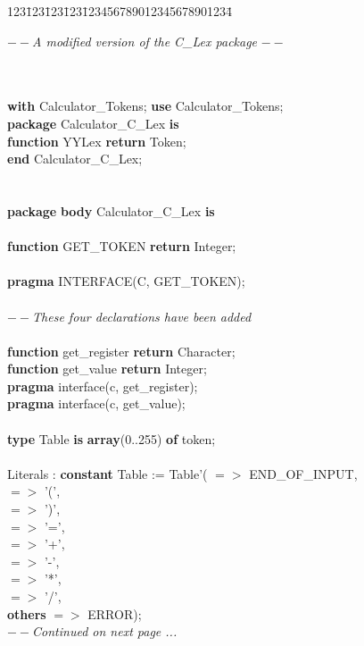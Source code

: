 \begin{tabbing}
123\=123\=123\=123\=123456789012345678901234\= \kill
\centerline{$--${\it  A modified version of the C\_Lex package }$--$}\\
\\
{\bf with} Calculator\_Tokens; {\bf use} Calculator\_Tokens;\\
{\bf package} Calculator\_C\_Lex {\bf is}\\
\>  {\bf function} YYLex {\bf return} Token;\\
{\bf end} Calculator\_C\_Lex;\\
\\
\\
{\bf package} {\bf body} Calculator\_C\_Lex {\bf is}\\
\\
\>  {\bf function} GET\_TOKEN {\bf return} Integer;\\
\\
\>  {\bf pragma} INTERFACE(C, GET\_TOKEN);\\
\\
\>  $--${\it  These four declarations have been added}\\
\\
\>  {\bf function} get\_register {\bf return} Character;\\
\>  {\bf function} get\_value    {\bf return} Integer;\\
\>  {\bf pragma} interface(c, get\_register);\\
\>  {\bf pragma} interface(c, get\_value);\\
\\
\>  {\bf type} Table {\bf is} {\bf array}(0..255) {\bf of} token;\\
\\
\>  Literals : {\bf constant} Table := Table'(\>\>\> $=>$ END\_OF\_INPUT,\\
\>\>\>\>     $=>$ '(',\\
\>\>\>\>     $=>$ ')',\\
\>\>\>\>     $=>$ '=',\\
\>\>\>\>     $=>$ '+',\\
\>\>\>\>     $=>$ '-',\\
\>\>\>\>     $=>$ '*',\\
\>\>\>\>     $=>$ '/',\\
\>\>\>\>\>                                      {\bf others} $=>$ ERROR);\\
  $--${\it  Continued on next page ...} \\
\end{tabbing}
